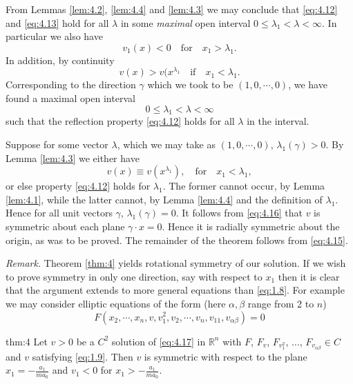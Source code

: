 From Lemmas \ref{lem:4.2}, \ref{lem:4.4} and \ref{lem:4.3} we may conclude that \eqref{eq:4.12} and \eqref{eq:4.13} hold for all $\lambda$ in some \textit{maximal} open interval $0\leq  \lambda_1 < \lambda < \infty$. In particular we also have
\begin{equation}\label{eq:4.15}
	v_1(x)<0 \quad\text{for}\quad x_1>\lambda_1. 
\end{equation}
In addition, by continuity
\begin{equation}\label{eq:4.16}
	v(x)>v(x^{\lambda_1}\quad \text{if}\quad x_1 <\lambda_1 .
\end{equation}
Corresponding to the direction $\gamma$ which we took to be $(1,0,\cdots,0)$, we have found a maximal open interval
\[0\leq \lambda_1<\lambda<\infty\]
such that the reflection property \eqref{eq:4.12} holds for all $\lambda$ in the interval.

Suppose for some vector $\lambda$, which we may take as $(1,0,\cdots,0)$, $\lambda_1(\gamma)>0$. By Lemma \ref{lem:4.3} we either have
\[ v(x)\equiv v(x^{\lambda_1}),\quad\text{for}\quad x_1<\lambda_1,\]
or else property \eqref{eq:4.12} holds for $\lambda_1$. The former cannot occur, by Lemma \ref{lem:4.1}, while the latter cannot, by Lemma \ref{lem:4.4} and the definition of $\lambda_1$. Hence for all unit vectors $\gamma$, $\lambda_1(\gamma)=0$. It follows from \eqref{eq:4.16} that $v$ is symmetric about each plane $\gamma\cdot x=0$. Hence it is radially symmetric about the origin, as was to be proved.
The remainder of the theorem follows from \eqref{eq:4.15}.

\noindent
\textit{Remark. }Theorem \ref{thm:4} yields rotational symmetry of our solution. If we wish to prove symmetry in only one direction, say with respect to $x_1$ then it is clear that the argument extends to more general equations than \eqref{eq:1.8}. For example we may
consider elliptic equations of the form (here $\alpha,\beta$ range from 2 to $n$)
\begin{equation}\label{eq:4.17}	F(x_2,\cdots,x_n,v,v_1^2,v_2,\cdots,v_n,v_{11},v_{\alpha\beta})=0
\end{equation}
\begin{theoremp}{thm:4}\label{thm:4'}
  Let $v > 0$ be a $C^2$ solution of \eqref{eq:4.17} in $\mathbb{R}^n$ 
  with $F$, $F_v$, $F_{v_1^2}$, $\ldots$, $F_{v_{\alpha\beta}} \in C$ and $v$ satisfying \eqref{eq:1.9}. 
  Then $v$ is symmetric with respect to the plane $x_1 = - \frac{a_1}{ma_0}$ 
  and $v_1<0$ for $ x_1>-\frac{a_1}{ma_0}$.
\end{theoremp}